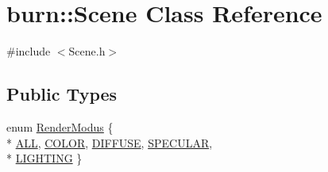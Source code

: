 \hypertarget{classburn_1_1_scene}{\section{burn\-:\-:Scene Class Reference}
\label{classburn_1_1_scene}
}


{\ttfamily \#include $<$Scene.\-h$>$}

\subsection*{Public Types}
\begin{DoxyCompactItemize}
\item 
enum \hyperlink{classburn_1_1_scene_a992349a23199d694dca7b8cbd4957299}{Render\-Modus} \{ \\*
\hyperlink{classburn_1_1_scene_a992349a23199d694dca7b8cbd4957299ae9ec19b90411b53dc2f739816b55a828}{A\-L\-L}, 
\hyperlink{classburn_1_1_scene_a992349a23199d694dca7b8cbd4957299adc90a5eb364cefa561a349bba4afc0d6}{C\-O\-L\-O\-R}, 
\hyperlink{classburn_1_1_scene_a992349a23199d694dca7b8cbd4957299ac85a19cebcbd9de06a84f792bec68230}{D\-I\-F\-F\-U\-S\-E}, 
\hyperlink{classburn_1_1_scene_a992349a23199d694dca7b8cbd4957299a5d0d45e2fe08c563948f5be503002b95}{S\-P\-E\-C\-U\-L\-A\-R}, 
\\*
\hyperlink{classburn_1_1_scene_a992349a23199d694dca7b8cbd4957299a9afb07fe8e20b8189d66ac620ce427b4}{L\-I\-G\-H\-T\-I\-N\-G}
 \}
\end{DoxyCompactItemize}
